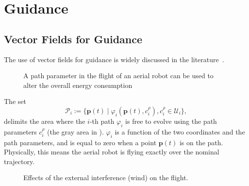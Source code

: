 
\chapter{\color{red}Guidance}
\label{cp:gd}




\section{\color{red}Vector Fields for Guidance}

The use of vector fields for guidance is widely discussed in the literature~\citep{lindemann2005smoothly,gonccalves2010vector,panagou2014motion,zhou2014vector,kapitanyuk2017guiding,de2017guidance}.

\begin{figure}[h]
  \centering
  
  \caption[Path parameter in the flight of an aerial robot]{A path parameter in the flight of an aerial robot can be used to alter the overall energy consumption}
  \label{fig:tee1}
\end{figure}
%  

The set
\begin{equation}\label{eq:area}
  \mathcal{P}_i:=\{\mathbf{p}(t)\mid\varphi_i(\mathbf{p}(t),c_{i}^\rho),c_i^\rho\in\mathcal{U}_i\},
\end{equation}
delimits the area where the $i$-th path $\varphi_i$ is free to evolve using the path parameters $c_i^\rho$ (the gray area in ). $\varphi_i$ is a function of the two coordinates and the path parameters, and is equal to zero when a point $\mathbf{p}(t)$ is on the path. Physically, this means the aerial robot is flying exactly over the nominal trajectory. 

\begin{figure}[h]
  \centering
  
  \caption[External interference on the path]{Effects of the external interference (wind) on the flight.}
  \label{fig:tee3}
\end{figure}

